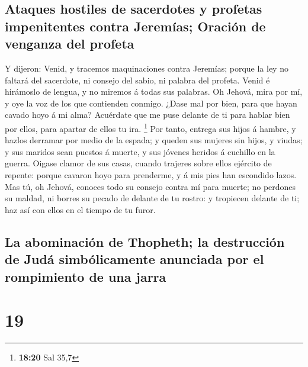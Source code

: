 \hypertarget{ataques-hostiles-de-sacerdotes-y-profetas-impenitentes-contra-jeremuxedas-oraciuxf3n-de-venganza-del-profeta}{%
\subsection{Ataques hostiles de sacerdotes y profetas impenitentes
contra Jeremías; Oración de venganza del
profeta}\label{ataques-hostiles-de-sacerdotes-y-profetas-impenitentes-contra-jeremuxedas-oraciuxf3n-de-venganza-del-profeta}}

 Y dijeron: Venid, y tracemos maquinaciones contra
Jeremías; porque la ley no faltará del sacerdote, ni consejo del sabio,
ni palabra del profeta. Venid é hirámoslo de lengua, y no miremos á
todas sus palabras.  Oh Jehová, mira por mí, y oye la voz
de los que contienden conmigo.  ¿Dase mal por bien, para
que hayan cavado hoyo á mi alma? Acuérdate que me puse delante de ti
para hablar bien por ellos, para apartar de ellos tu ira. \footnote{\textbf{18:20}
  Sal 35,7}  Por tanto, entrega sus hijos á hambre, y
hazlos derramar por medio de la espada; y queden sus mujeres sin hijos,
y viudas; y sus maridos sean puestos á muerte, y sus jóvenes heridos á
cuchillo en la guerra.  Oigase clamor de sus casas, cuando
trajeres sobre ellos ejército de repente: porque cavaron hoyo para
prenderme, y á mis pies han escondido lazos.  Mas tú, oh
Jehová, conoces todo su consejo contra mí para muerte; no perdones su
maldad, ni borres su pecado de delante de tu rostro: y tropiecen delante
de ti; haz así con ellos en el tiempo de tu furor.

\hypertarget{la-abominaciuxf3n-de-thopheth-la-destrucciuxf3n-de-juduxe1-simbuxf3licamente-anunciada-por-el-rompimiento-de-una-jarra}{%
\subsection{La abominación de Thopheth; la destrucción de Judá
simbólicamente anunciada por el rompimiento de una
jarra}\label{la-abominaciuxf3n-de-thopheth-la-destrucciuxf3n-de-juduxe1-simbuxf3licamente-anunciada-por-el-rompimiento-de-una-jarra}}

\hypertarget{section-18}{%
\section{19}\label{section-18}}

